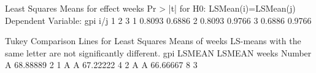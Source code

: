 \documentclass{article}
\begin{document}
\begin{Woutput}
     Least Squares Means for effect weeks
     Pr > |t| for H0: LSMean(i)=LSMean(j)
           Dependent Variable: gpi
i/j              1             2             3
   1                      0.8093        0.6886
   2        0.8093                      0.9766
   3        0.6886        0.9766

Tukey Comparison Lines for Least Squares Means of weeks
LS-means with the same letter are not significantly different.
           gpi             LSMEAN
        LSMEAN    weeks    Number
A     68.88889    2             1
A
A     67.22222    4             2
A
A     66.66667    8             3
\end{Woutput}
\end{document}
